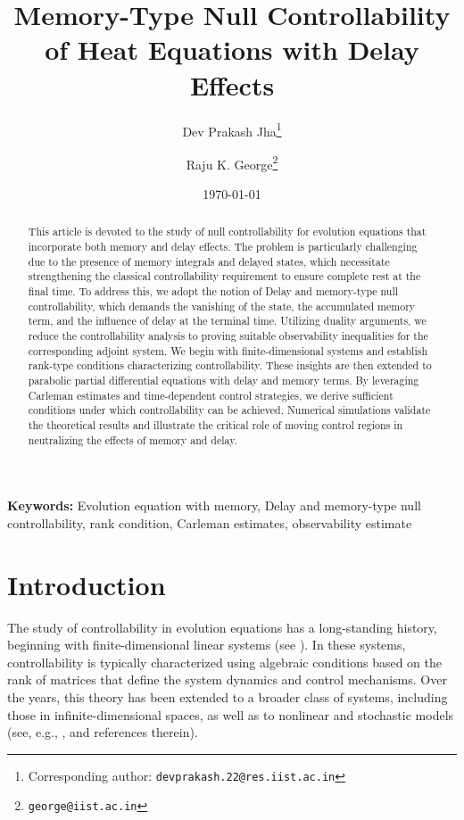 \documentclass[12pt]{article}
\title{Memory-Type Null Controllability of Heat Equations with Delay Effects}
\author[1]{Dev Prakash Jha\thanks{Corresponding author: \texttt{devprakash.22@res.iist.ac.in}}}
\author[1]{Raju K. George\thanks{\texttt{george@iist.ac.in}}}
\affil[1]{Department of Mathematics, Indian Institute of Space Science and Technology, Thiruvananthapuram, 695547, Kerala, India}
\date{\today}
\newcommand{\keywords}[1]{\par\noindent\textbf{Keywords:} #1}
\theoremstyle{plain}
\theoremstyle{definition}
\begin{document}
\maketitle

\begin{abstract}
This article is devoted to the study of null controllability for evolution equations that incorporate both memory and delay effects. The problem is particularly challenging due to the presence of memory integrals and delayed states, which necessitate strengthening the classical controllability requirement to ensure complete rest at the final time. To address this, we adopt the notion of Delay and memory-type null controllability, which demands the vanishing of the state, the accumulated memory term, and the influence of delay at the terminal time. Utilizing duality arguments, we reduce the controllability analysis to proving suitable observability inequalities for the corresponding adjoint system. We begin with finite-dimensional systems and establish rank-type conditions characterizing controllability. These insights are then extended to parabolic partial differential equations with delay and memory terms. By leveraging Carleman estimates and time-dependent control strategies, we derive sufficient conditions under which controllability can be achieved. Numerical simulations validate the theoretical results and illustrate the critical role of moving control regions in neutralizing the effects of memory and delay.
\end{abstract}



\keywords{Evolution equation with memory, Delay and memory-type null controllability, rank condition, Carleman estimates, observability estimate}





\section{Introduction}
\label{sec:intro}

The study of controllability in evolution equations has a long-standing history, beginning with finite-dimensional linear systems (see \cite{kalman1960general}). In these systems, controllability is typically characterized using algebraic conditions based on the rank of matrices that define the system dynamics and control mechanisms. Over the years, this theory has been extended to a broader class of systems, including those in infinite-dimensional spaces, as well as to nonlinear and stochastic models (see, e.g., \cite{avdonin1995families,fursikov1996controllability,lions1988controlabilite,russell1978controllability,zuazua2007controllability}, and references therein).
\end{document}
